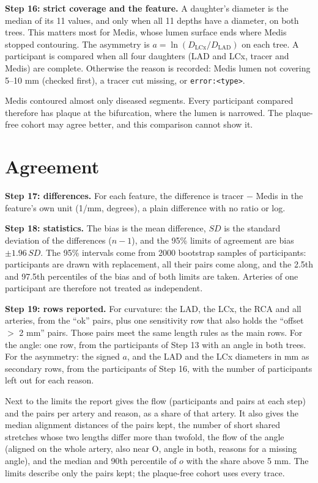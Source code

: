 \documentclass[11pt,a4paper]{article}
\newcommand{\code}[1]{\texttt{#1}}
\begin{document}
\textbf{Step 16: strict coverage and the feature.} A daughter's diameter is the median of its 11 values,
and only when all 11 depths have a diameter, on both trees. This matters most for Medis, whose lumen
surface ends where Medis stopped contouring. The asymmetry is $a=\ln(D_{\text{LCx}}/D_{\text{LAD}})$ on
each tree. A participant is compared when all four daughters (LAD and LCx, tracer and Medis) are complete.
Otherwise the reason is recorded: Medis lumen not covering 5--10 mm (checked first), a tracer cut missing,
or \code{error:<type>}.

Medis contoured almost only diseased segments. Every participant compared therefore has plaque at the
bifurcation, where the lumen is narrowed. The plaque-free cohort may agree better, and this comparison
cannot show it.

\section{Agreement}

\textbf{Step 17: differences.} For each feature, the difference is tracer $-$ Medis in the feature's own
unit (1/mm, degrees), a plain difference with no ratio or log.

\textbf{Step 18: statistics.} The bias is the mean difference, $\mathit{SD}$ is the standard deviation
of the differences ($n-1$), and the 95\% limits of agreement are bias $\pm 1.96\,\mathit{SD}$. The 95\%
intervals come from 2000 bootstrap samples of participants: participants are drawn with replacement, all
their pairs come along, and the 2.5th and 97.5th percentiles of the bias and of both limits are taken.
Arteries of one participant are therefore not treated as independent.

\textbf{Step 19: rows reported.} For curvature: the LAD, the LCx, the RCA and all arteries, from the
``ok'' pairs, plus one sensitivity row that also holds the ``offset $>$ 2 mm'' pairs. Those pairs meet the
same length rules as the main rows. For the angle: one row, from the participants of Step 13 with an angle
in both trees. For the asymmetry: the signed
$a$, and the LAD and the LCx diameters in mm as secondary rows, from the participants of Step 16, with the
number of participants left out for each reason.

Next to the limits the report gives the flow (participants and pairs at each step) and the pairs per
artery and reason, as a share of that artery. It also gives the median alignment distances of the pairs
kept, the number of short shared stretches whose two lengths differ more than twofold, the flow of the
angle (aligned on the whole artery, also near O, angle in both, reasons for a missing angle), and the
median and 90th percentile of $o$ with the share above 5 mm. The limits describe only the pairs kept; the
plaque-free cohort uses every trace.
\end{document}
